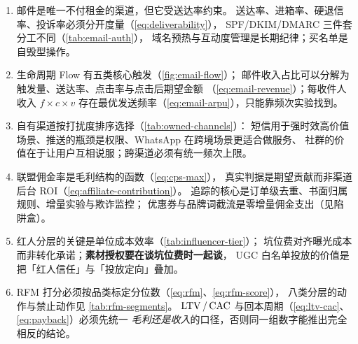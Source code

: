 \begin{keypoint}[本章要点回顾]
\begin{enumerate}
        （\cref{tab:abandon-sequence}）。运费与税费是\emph{定价结构}问题，
        不是信息展示问题；免运费门槛可以同时提升转化率与客单价。
  \item 邮件是唯一不付租金的渠道，但它受送达率约束。
        送达率、进箱率、硬退信率、投诉率必须分开度量（\cref{eq:deliverability}），
        SPF/DKIM/DMARC 三件套分工不同（\cref{tab:email-auth}），
        域名预热与互动度管理是长期纪律；买名单是自毁型操作。
  \item 生命周期 Flow 有五类核心触发（\cref{fig:email-flow}）；
        邮件收入占比可以分解为触发量、送达率、点击率与点击后期望金额
        （\cref{eq:email-revenue}）；每收件人收入 $f \times c \times v$
        存在最优发送频率（\cref{eq:email-arpu}），只能靠频次实验找到。
  \item 自有渠道按打扰度排序选择（\cref{tab:owned-channels}）：
        短信用于强时效高价值场景、推送的瓶颈是权限、WhatsApp 在跨境场景更适合做服务、
        社群的价值在于让用户互相说服；跨渠道必须有统一频次上限。
  \item 联盟佣金率是毛利结构的函数（\cref{eq:cps-max}），
        真实判据是期望贡献而非渠道后台 ROI（\cref{eq:affiliate-contribution}）。
        追踪的核心是订单级去重、书面归属规则、增量实验与欺诈监控；
        优惠券与品牌词截流是零增量佣金支出（见陷阱盒）。
  \item 红人分层的关键是单位成本效率（\cref{tab:influencer-tier}）；
        坑位费对齐曝光成本而非转化承诺；\textbf{素材授权要在谈坑位费时一起谈}，
        UGC 白名单投放的价值是把「红人信任」与「投放定向」叠加。
  \item RFM 打分必须按品类标定分位数（\cref{eq:rfm}、\cref{eq:rfm-score}），
        八类分层的动作与禁止动作见 \cref{tab:rfm-segments}。
        $\operatorname{LTV}/\operatorname{CAC}$ 与回本周期（\cref{eq:ltv-cac}、\cref{eq:payback}）必须先统一
        \emph{毛利还是收入}的口径，否则同一组数字能推出完全相反的结论。
\end{enumerate}
\end{keypoint}

